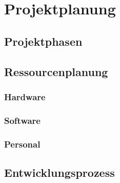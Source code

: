 \section{Projektplanung}
\label{sec:Projektplanung}

\subsection{Projektphasen}
\label{sec:Projektphasen}


\subsection{Ressourcenplanung}
\label{sec:Ressourcenplanung}

\subsubsection{Hardware}

\subsubsection{Software}

\subsubsection{Personal}

\subsection{Entwicklungsprozess}
\label{sec:Entwicklungsprozess}

